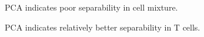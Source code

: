 \documentclass[3p,authoryear,preprint,12pt]{elsarticle}
\makeatletter
\def\fixFloatSize#1{}%
\makeatother
\begin{document}
\bgroup
\fixFloatSize{img/mixPCA.png}
\begin{figure}[!htbp]
	\centering \makeatletter{}
	\makeatother 
	\caption{{PCA indicates poor separability in cell mixture.}}
	\label{f-c2b15a1bace9}
\end{figure}
\egroup
\bgroup
\fixFloatSize{img/TPCA.png}
\begin{figure}[!htbp]
	\centering \makeatletter{}
	\makeatother 
	\caption{{PCA indicates relatively better separability in T cells.}}
	\label{f-c2b15a1bacf9}
\end{figure}
\end{document}
